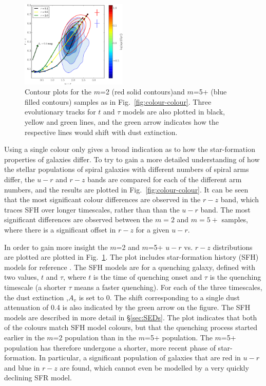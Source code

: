 \documentclass[useAMS,usenatbib]{mn2e}
\begin{document}
\begin{figure}
		\centering

        \includegraphics[width=0.45\textwidth]{Images/Results/cc1_w_sfh.pdf}

        \caption{Contour plots for the $m$=2 (red solid contours)and $m$=5+ (blue filled contours) samples as in Fig.~\ref{fig:colour-colour}. Three evolutionary tracks for $t$ and $\tau$ \citet{BC_03} models are also plotted in black, yellow and green lines, and the green arrow indicates how the respective lines would shift with dust extinction.}

        \label{fig:cc_w_sfh}

\end{figure}

Using a single colour only gives a broad indication as to how the star-formation properties of galaxies differ. To try to gain a more detailed understanding of how the stellar populations of spiral galaxies with different numbers of spiral arms differ, the $u-r$ and $r-z$ bands are compared for each of the different arm numbers, and the results are plotted in Fig.~\ref{fig:colour-colour}. It can be seen that the most significant colour differences are observed in the $r-z$ band, which traces SFH over longer timescales, rather than than the $u-r$ band. The most significant differences are observed between the $m=2$ and $m=5+$ samples, where there is a significant offset in $r-z$ for a given $u-r$. 

In order to gain more insight the $m$=2 and $m$=5+ $u-r$ vs. $r-z$ distributions are plotted are plotted  in Fig.~\ref{fig:cc_w_sfh}. The plot includes star-formation history (SFH) models for reference \citep{BC_03}. The SFH models are for a  quenching galaxy, defined with two values, $t$ and $\tau$, where $t$ is the time of quenching onset and $\tau$ is the quenching timescale (a shorter $\tau$ means a faster quenching). For each of the three timescales, the dust extinction ,$A_v$ is set to 0. The shift corresponding to a single dust attenuation of 0.4 is also indicated by the green arrow on the figure. The SFH models are described in more detail in \S\ref{sec:SEDs}. The plot indicates that both of the colours match SFH model colours, but that the quenching process started earlier in the $m$=2 population than in the $m$=5+ population. The $m$=5+ population has therefore undergone a shorter, more recent phase of star-formation. In particular, a significant population of galaxies that are red in $u-r$ and blue in $r-z$ are found, which cannot even be modelled by a very quickly declining SFR model.
\end{document}
